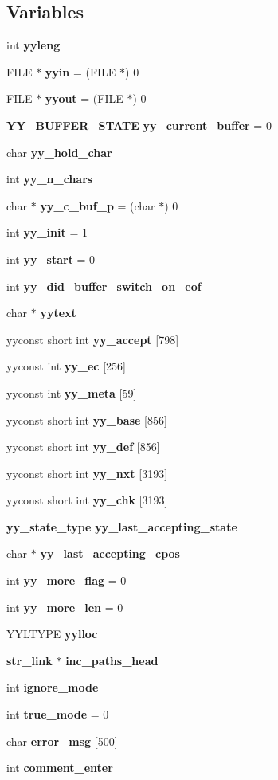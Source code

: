 \subsection*{Variables}
\begin{CompactItemize}
\item 
int {\bf yyleng}
\item 
FILE $\ast$ {\bf yyin} = (FILE $\ast$) 0
\item 
FILE $\ast$ {\bf yyout} = (FILE $\ast$) 0
\item 
{\bf YY\_\-BUFFER\_\-STATE} {\bf yy\_\-current\_\-buffer} = 0
\item 
char {\bf yy\_\-hold\_\-char}
\item 
int {\bf yy\_\-n\_\-chars}
\item 
char $\ast$ {\bf yy\_\-c\_\-buf\_\-p} = (char $\ast$) 0
\item 
int {\bf yy\_\-init} = 1
\item 
int {\bf yy\_\-start} = 0
\item 
int {\bf yy\_\-did\_\-buffer\_\-switch\_\-on\_\-eof}
\item 
char $\ast$ {\bf yytext}
\item 
yyconst short int {\bf yy\_\-accept} [798]
\item 
yyconst int {\bf yy\_\-ec} [256]
\item 
yyconst int {\bf yy\_\-meta} [59]
\item 
yyconst short int {\bf yy\_\-base} [856]
\item 
yyconst short int {\bf yy\_\-def} [856]
\item 
yyconst short int {\bf yy\_\-nxt} [3193]
\item 
yyconst short int {\bf yy\_\-chk} [3193]
\item 
{\bf yy\_\-state\_\-type} {\bf yy\_\-last\_\-accepting\_\-state}
\item 
char $\ast$ {\bf yy\_\-last\_\-accepting\_\-cpos}
\item 
int {\bf yy\_\-more\_\-flag} = 0
\item 
int {\bf yy\_\-more\_\-len} = 0
\item 
YYLTYPE {\bf yylloc}
\item 
{\bf str\_\-link} $\ast$ {\bf inc\_\-paths\_\-head}
\item 
int {\bf ignore\_\-mode}
\item 
int {\bf true\_\-mode} = 0
\item 
char {\bf error\_\-msg} [500]
\item 
int {\bf comment\_\-enter}

\end{CompactItemize}

